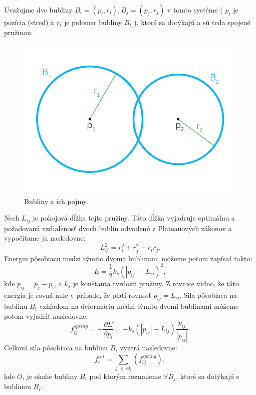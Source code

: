 Uvažujme dve bubliny $B_{i} = (p_{i}, r_{i}), B_{j} = (p_{j}, r_{j})$ v tomto systéme ( $p_{i}$ je pozícia (stred) a $r_{i}$ je polomer bubliny $B_{i}$ ), ktoré sa dotýkajú a sú teda spojené pružinou. 

\begin{figure}[H]
	\begin{center}
		\includegraphics[height=\imageHeight]{images/bubbles_legend}
		\caption{Bubliny a ich pojmy.}
		\label{img:verticies_displacement_2}
	\end{center}
\end{figure}

\noindent
Nech $L_{ij}$ je pokojová dĺžka tejto pružiny. Táto dĺžka vyjadruje optimálnu a požadovanú vzdialenosť dvoch bublín odvodenú z Plateauových zákonov a vypočítame ju nasledovne:
\begin{equation}
	L_{ij}^{2} = r_{i}^{2} + r_{j}^{2} - r_{i}r_{j}.
\end{equation} 
Energiu pôsobiacu medzi týmito dvoma bublinami môžeme potom zapísať takto:
\begin{equation}
	\label{eq:spring_system_energy}
	E = \frac{1}{2}k_{s}\left ( \left | p_{ij} \right | - L_{ij} \right )^{2},
\end{equation} 
kde $p_{ij} = p_{j} - p_{i}$, a $k_{s}$ je konštanta tvrdosti pružiny. Z rovnice  vidno, že táto energia je rovná nule v prípade, že platí rovnosť $p_{ij} = L_{ij}$. Sila pôsobiaca na bublinu $B_{i}$ vzhľadom na deformáciu medzi týmito dvomi bublinami môžeme potom vyjadriť nasledovne:
\begin{equation}
	\label{eq:spring_system_force_on_bubble}
	f_{ij}^{spring} = -\frac{\partial E}{\partial p_{i}} = -k_{s}\left ( \left | p_{ij} \right | - L_{ij} \right )\frac{p_{ij}}{\left | p_{ij} \right |}.
\end{equation} 
Celková sila pôsobiaca na bublinu $B_{i}$ vyzerá nasledovne:
\begin{equation}
	\label{eq:spring_system_total_int_force}
	f_{i}^{int} = \sum_{j\; \in \; O_{i}}\left ( f_{ij}^{spring} \right ),
\end{equation}
kde $O_{i}$ je okolie bubliny $B_{i}$ pod ktorým rozumieme $\forall B_{j}$, ktoré sa dotýkajú s bublinou $B_{i}$.

